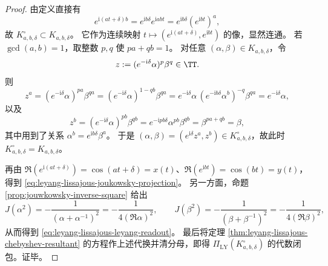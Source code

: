 \begin{proof}
由定义直接有
\[
e^{\mathrm{i}(at+\delta)b}=e^{\mathrm{i}b\delta}e^{\mathrm{i}abt}
=e^{\mathrm{i}b\delta}(e^{\mathrm{i}bt})^a,
\]
故 \(K_{a,b,\delta}^{\circ}\subset K_{a,b,\delta}\)。
它作为连续映射 \(t\mapsto (e^{\mathrm{i}(at+\delta)},e^{\mathrm{i}bt})\) 的像，显然连通。
若 \(\gcd(a,b)=1\)，取整数 \(p,q\) 使 \(pa+qb=1\)。
对任意 \((\alpha,\beta)\in K_{a,b,\delta}\)，令
\[
z:=(e^{-\mathrm{i}\delta}\alpha)^p\beta^q\in\TT.
\]
则
\[
z^a
=(e^{-\mathrm{i}\delta}\alpha)^{pa}\beta^{qa}
=(e^{-\mathrm{i}\delta}\alpha)^{1-qb}\beta^{qa}
=e^{-\mathrm{i}\delta}\alpha\,(e^{-\mathrm{i}b\delta}\alpha^b)^{-q}\beta^{qa}
=e^{-\mathrm{i}\delta}\alpha,
\]
以及
\[
z^b
=(e^{-\mathrm{i}\delta}\alpha)^{pb}\beta^{qb}
=e^{-\mathrm{i}pb\delta}\alpha^{pb}\beta^{qb}
=\beta^{pa+qb}
=\beta,
\]
其中用到了关系 \(\alpha^b=e^{\mathrm{i}b\delta}\beta^a\)。
于是 \((\alpha,\beta)=(e^{\mathrm{i}\delta}z^a,z^b)\in K_{a,b,\delta}^{\circ}\)，故此时 \(K_{a,b,\delta}^{\circ}=K_{a,b,\delta}\)。

再由 \(\Re(e^{\mathrm{i}(at+\delta)})=\cos(at+\delta)=x(t)\)、\(\Re(e^{\mathrm{i}bt})=\cos(bt)=y(t)\)，得到 \eqref{eq:leyang-lissajous-joukowsky-projection}。
另一方面，命题 \ref{prop:jouwkowsky-inverse-square} 给出
\[
J(\alpha^2)=-\frac{1}{(\alpha+\alpha^{-1})^2}
=-\frac{1}{4(\Re\alpha)^2},
\qquad
J(\beta^2)=-\frac{1}{(\beta+\beta^{-1})^2}
=-\frac{1}{4(\Re\beta)^2},
\]
从而得到 \eqref{eq:leyang-lissajous-leyang-readout}。
最后将定理 \ref{thm:leyang-lissajous-chebyshev-resultant} 的方程作上述代换并清分母，即得 \(\Pi_{\mathrm{LY}}(K_{a,b,\delta}^{\circ})\) 的代数闭包。证毕。
\end{proof}



